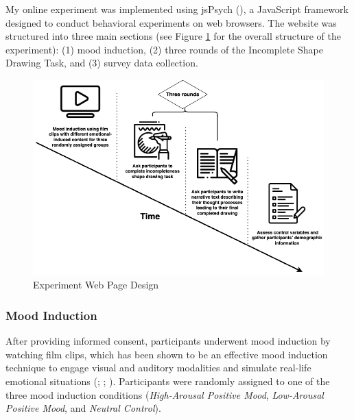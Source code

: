 \documentclass[../MA_Thesis.tex]{subfiles}
\begin{document}
My online experiment was implemented using jsPsych (\cite{leeuw_jspsych_2023}), a JavaScript framework designed to conduct behavioral experiments on web browsers. The website was structured into three main sections (see Figure \ref{fig: Experiment Web Page Design} for the overall structure of the experiment): (1) mood induction, (2) three rounds of the Incomplete Shape Drawing Task, and (3) survey data collection.

\begin{figure}
    \centering
    \includegraphics[width=0.7\linewidth, keepaspectratio]{drawio/Experiment Timeline.png}
    \caption{Experiment Web Page Design}
    \label{fig: Experiment Web Page Design}
\end{figure}

\subsubsection*{Mood Induction}
After providing informed consent, participants underwent mood induction by watching film clips, which has been shown to be an effective mood induction technique to engage visual and auditory modalities and simulate real-life emotional situations (\cite{coan_handbook_2007}; \cite{fernandez-aguilar_how_2019}; \cite{siedlecka_experimental_2019}). Participants were randomly assigned to one of the three mood induction conditions (\textit{High-Arousal Positive Mood}, \textit{Low-Arousal Positive Mood}, and \textit{Neutral Control}). 
\end{document}
